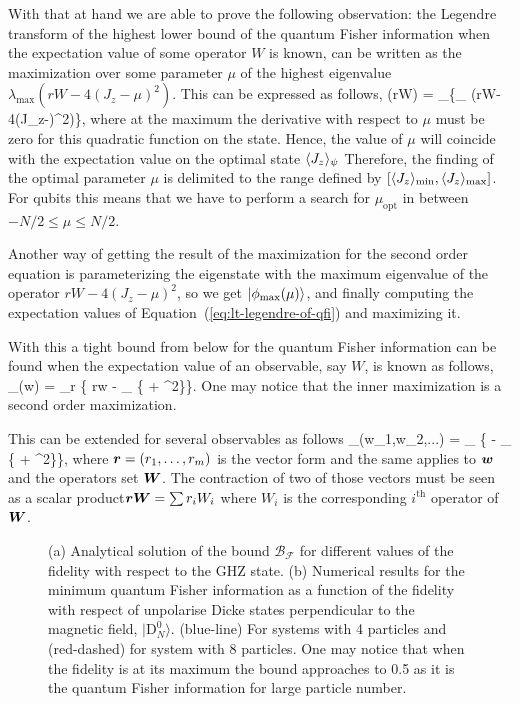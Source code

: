 With that at hand we are able to prove the following observation: the Legendre transform of the highest lower bound of the quantum Fisher information when the expectation value of some operator $W$ is known, can be written as the maximization over some parameter $\mu$ of the highest eigenvalue  $\lambda_{\max}(rW-4(J_z-\mu)^2)$.
This can  be expressed as follows,
\be
  \hat{\qfi}(rW) = \sup_\mu \{\lambda_{\max} (rW-4(J_z-\mu)^2)\},
\ee
where at the maximum the derivative with respect to $\mu$ must be zero for this quadratic function on the state.
Hence, the value of $\mu$ will coincide with the expectation value on the optimal state $\langle J_z \rangle_{\psi}$
Therefore, the finding of the optimal parameter $\mu$ is delimited to the range defined by $[\langle J_z \rangle_{\min},\langle J_z \rangle_{\max}]$.
For qubits this means that we have to perform a search for $\mu_{\text{opt}}$ in between $-N/2\leq \mu \leq N/2$.

Another way of getting the result of the maximization for the second order equation is parameterizing the eigenstate with the maximum eigenvalue of the operator $rW-4(J_z-\mu)^2$, so we get $\vert \phi_{\max}(\mu) \rangle$, and finally computing the expectation values of Equation~(\ref{eq:lt-legendre-of-qfi}) and maximizing it.

With this a tight bound from below for the quantum Fisher information can be found when the expectation value of an observable, say $W$, is known as follows,
\be
  _{}(w) = \sup_r \big\{ rw - \sup_{\ket{\psi}} \{ + ^2\}\big\}.
\ee
One may notice that the inner maximization is a second order maximization.

This can be extended for several observables as follows
\be
  _{}(w_1,w_2,...) = \sup_{} \big\{  - \sup_{\ket{\psi}} \{ + ^2\}\big\},
\ee
where $\boldsymbol{r}=(r_1,\dots,r_m)$ is the vector form and the same applies to $\boldsymbol{w}$ and the operators set $\boldsymbol{W}$.
The contraction of two of those vectors must be seen as a scalar product\ie $\boldsymbol{rW}=\sum r_iW_i$ where $W_i$ is the corresponding $i^{\text{th}}$ operator of $\boldsymbol{W}$.

\begin{figure}
  \centering
  \caption{(a) Analytical solution of the bound $\mathcal{B}_{\mathcal{F}}$ for different values of the fidelity with respect to the GHZ state. (b) Numerical results for the minimum quantum Fisher information as a function of the fidelity with respect of unpolarise Dicke states perpendicular to the magnetic field, $|\text{D}_N^0\rangle$. (blue-line) For systems with 4 particles and (red-dashed) for system with 8 particles. One may notice that when the fidelity is at its maximum the bound approaches to 0.5 as it is the quantum Fisher information for large particle number.}
  \label{fig:vd-secuence-evo}
\end{figure}

